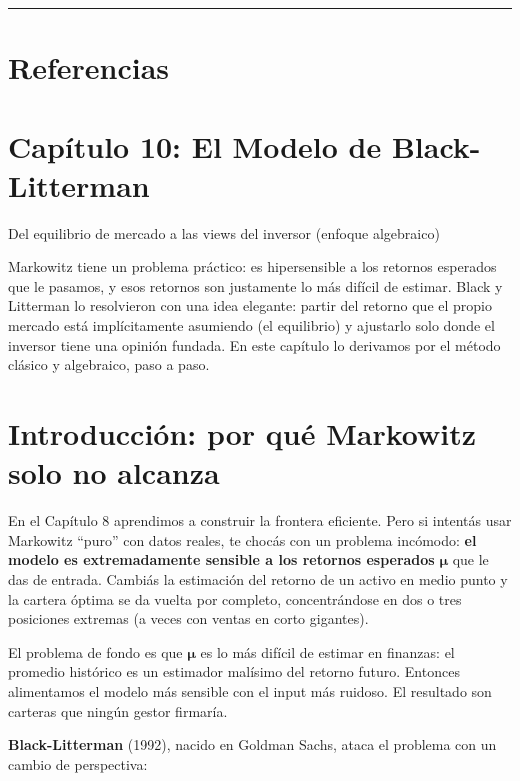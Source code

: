\documentclass[
  spanish,
  letterpaper,
  DIV=11,
  numbers=noendperiod]{scrreprt}
\begin{document}
\begin{center}\rule{0.5\linewidth}{0.5pt}\end{center}

\chapter{Referencias}\label{referencias-8}

\label{refs}

\chapter{Capítulo 10: El Modelo de
Black-Litterman}\label{capuxedtulo-10-el-modelo-de-black-litterman}

Del equilibrio de mercado a las views del inversor (enfoque algebraico)

Markowitz tiene un problema práctico: es hipersensible a los retornos
esperados que le pasamos, y esos retornos son justamente lo más difícil
de estimar. Black y Litterman lo resolvieron con una idea elegante:
partir del retorno que el propio mercado está implícitamente asumiendo
(el equilibrio) y ajustarlo solo donde el inversor tiene una opinión
fundada. En este capítulo lo derivamos por el método clásico y
algebraico, paso a paso.

\hfill\break

\chapter{Introducción: por qué Markowitz solo no
alcanza}\label{introducciuxf3n-por-quuxe9-markowitz-solo-no-alcanza}

En el Capítulo 8 aprendimos a construir la frontera eficiente. Pero si
intentás usar Markowitz ``puro'' con datos reales, te chocás con un
problema incómodo: \textbf{el modelo es extremadamente sensible a los
retornos esperados} \(\boldsymbol{\mu}\) que le das de entrada. Cambiás
la estimación del retorno de un activo en medio punto y la cartera
óptima se da vuelta por completo, concentrándose en dos o tres
posiciones extremas (a veces con ventas en corto gigantes).

El problema de fondo es que \(\boldsymbol{\mu}\) es lo más difícil de
estimar en finanzas: el promedio histórico es un estimador malísimo del
retorno futuro. Entonces alimentamos el modelo más sensible con el input
más ruidoso. El resultado son carteras que ningún gestor firmaría.

\textbf{Black-Litterman} (1992), nacido en Goldman Sachs, ataca el
problema con un cambio de perspectiva:
\end{document}
